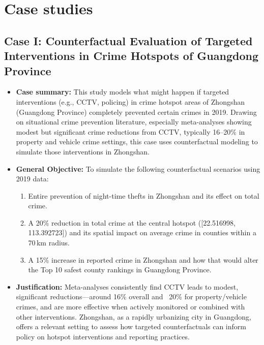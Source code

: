 
\section{Case studies}

\subsection{Case I: Counterfactual Evaluation of Targeted Interventions in Crime Hotspots of Guangdong Province}

\begin{itemize}
       \item \textbf{Case summary:} This study models what might happen if targeted interventions (e.g., CCTV, policing) in crime hotspot areas of Zhongshan (Guangdong Province) completely prevented certain crimes in 2019. Drawing on situational crime prevention literature, especially meta-analyses showing modest but significant crime reductions from CCTV, typically 16–20\% in property and vehicle crime settings, this case uses counterfactual modeling to simulate those interventions in Zhongshan.
      \item \textbf{General Objective:} To simulate the following counterfactual scenarios using 2019 data:
      \begin{enumerate}
          \item Entire prevention of night-time thefts in Zhongshan and its effect on total crime.
          \item A 20\% reduction in total crime at the central hotspot ([22.516998, 113.392723]) and its spatial impact on average crime in counties within a 70 km radius.
          \item A 15\% increase in reported crime in Zhongshan and how that would alter the Top 10 safest county rankings in Guangdong Province.
      \end{enumerate}
      \item \textbf{Justification:} Meta-analyses consistently find CCTV leads to modest, significant reductions—around 16\% overall and ~20\% for property/vehicle crimes, and are more effective when actively monitored or combined with other interventions. Zhongshan, as a rapidly urbanizing city in Guangdong, offers a relevant setting to assess how targeted counterfactuals can inform policy on hotspot interventions and reporting practices.


\end{itemize}
